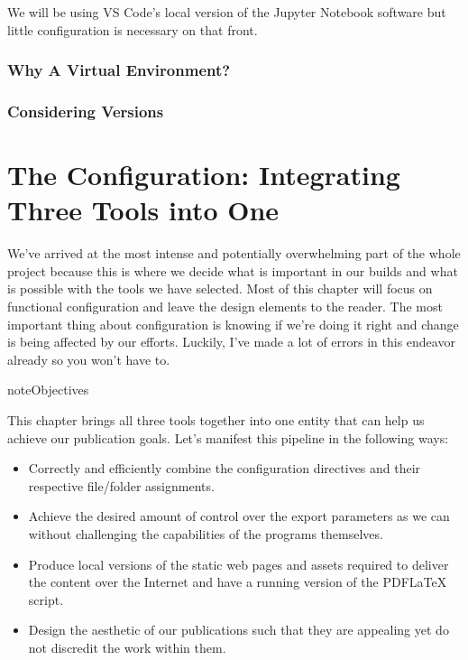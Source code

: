 \documentclass[letterpaper,12pt,english]{sphinxmanual}
\begin{document}
\sphinxAtStartPar
We will be using VS Code’s local version of the Jupyter Notebook software but little configuration is necessary on that front.


\subsection{Why A Virtual Environment?}
\label{\detokenize{_notebooks/01-the-env:why-a-virtual-environment}}

\subsection{Considering Versions}
\label{\detokenize{_notebooks/01-the-env:considering-versions}}
\sphinxstepscope


\chapter{The Configuration: Integrating Three Tools into One}
\label{\detokenize{_notebooks/02-the-config:the-configuration-integrating-three-tools-into-one}}\label{\detokenize{_notebooks/02-the-config::doc}}
\sphinxAtStartPar
We’ve arrived at the most intense and potentially overwhelming part of the whole project because this is where we decide what is important in our builds and what is possible with the tools we have selected. Most of this chapter will focus on functional configuration and leave the design elements to the reader. The most important thing about configuration is knowing if we’re doing it right and change is being affected by our efforts. Luckily, I’ve made a lot of errors in this endeavor already so you won’t have to.

\begin{sphinxadmonition}{note}{Objectives}

\sphinxAtStartPar
This chapter brings all three tools together into one entity that can help us achieve our publication goals. Let’s manifest this pipeline in the following ways:
\begin{itemize}
\item {} 
\sphinxAtStartPar
Correctly and efficiently combine the configuration directives and their respective file/folder assignments.

\item {} 
\sphinxAtStartPar
Achieve the desired amount of control over the export parameters as we can without challenging the capabilities of the programs themselves.

\item {} 
\sphinxAtStartPar
Produce local versions of the static web pages and assets required to deliver the content over the Internet and have a running version of the PDFLaTeX script.

\item {} 
\sphinxAtStartPar
Design the aesthetic of our publications such that they are appealing yet do not discredit the work within them.

\end{itemize}
\end{sphinxadmonition}
\end{document}
